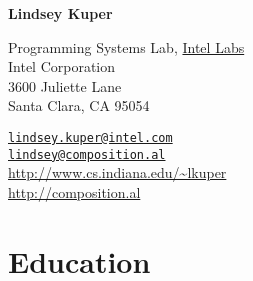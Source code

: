 \documentclass[10pt,letterpaper]{article}
\def\name{Lindsey Kuper}
\begin{document}
\centerline{\Huge \textbf{\name}}

\bigskip
\bigskip

\begin{minipage}[t]{0.5\textwidth}
  \small
  Programming Systems Lab, \href{http://www.intel.com/content/www/us/en/research/intel-research.html}{Intel Labs} \\
  Intel Corporation \\
  3600 Juliette Lane \\
  Santa Clara, CA 95054
\end{minipage}
\begin{minipage}[t]{0.5\textwidth}
  \small
  \raggedleft
  \href{mailto:lindsey.kuper@intel.com}{\nolinkurl{lindsey.kuper@intel.com}} \\
  \href{mailto:lindsey@composition.al}{\nolinkurl{lindsey@composition.al}} \\ 
  \url{http://www.cs.indiana.edu/~lkuper} \\
  \url{http://composition.al}
\end{minipage}

\section*{Education}
\end{document}
